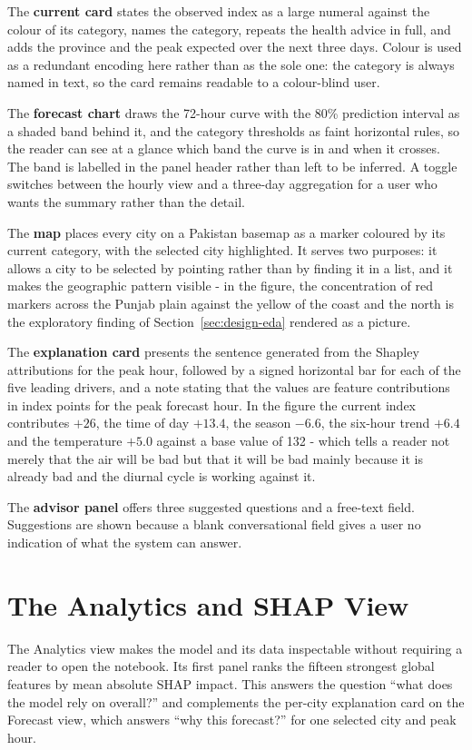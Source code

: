 The \textbf{current card} states the observed index as a large numeral against the
colour of its category, names the category, repeats the health advice in full, and
adds the province and the peak expected over the next three days. Colour is used
as a redundant encoding here rather than as the sole one: the category is always
named in text, so the card remains readable to a colour-blind user.

The \textbf{forecast chart} draws the 72-hour curve with the 80\% prediction
interval as a shaded band behind it, and the category thresholds as faint
horizontal rules, so the reader can see at a glance which band the curve is in and
when it crosses. The band is labelled in the panel header rather than left to be
inferred. A toggle switches between the hourly view and a three-day aggregation
for a user who wants the summary rather than the detail.

The \textbf{map} places every city on a Pakistan basemap as a marker coloured by
its current category, with the selected city highlighted. It serves two purposes:
it allows a city to be selected by pointing rather than by finding it in a list,
and it makes the geographic pattern visible - in the figure, the concentration of
red markers across the Punjab plain against the yellow of the coast and the north
is the exploratory finding of Section~\ref{sec:design-eda} rendered as a picture.

The \textbf{explanation card} presents the sentence generated from the Shapley
attributions for the peak hour, followed by a signed horizontal bar for each of
the five leading drivers, and a note stating that the values are feature
contributions in index points for the peak forecast hour. In the figure the
current index contributes $+26$, the time of day $+13.4$, the season $-6.6$, the
six-hour trend $+6.4$ and the temperature $+5.0$ against a base value of 132 -
which tells a reader not merely that the air will be bad but that it will be bad
mainly because it is already bad and the diurnal cycle is working against it.

The \textbf{advisor panel} offers three suggested questions and a free-text field.
Suggestions are shown because a blank conversational field gives a user no
indication of what the system can answer.

\section{The Analytics and SHAP View}
The Analytics view makes the model and its data inspectable without requiring a
reader to open the notebook. Its first panel ranks the fifteen strongest global
features by mean absolute SHAP impact. This answers the question ``what does the
model rely on overall?'' and complements the per-city explanation card on the
Forecast view, which answers ``why this forecast?'' for one selected city and peak
hour.

